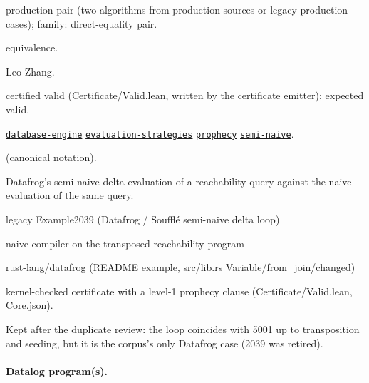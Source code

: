 \documentclass[10pt]{article}
\begin{document}
\begin{description}[leftmargin=2.6cm,style=nextline,itemsep=1pt]

\item[Category] production pair (two algorithms from production sources or legacy production cases); family: direct-equality pair.

\item[Kind] equivalence.

\item[Contributors] Leo Zhang.

\item[Status] certified valid (Certificate/Valid.lean, written by the certificate emitter); expected valid.

\item[Tags] \hyperref[tag:database-engine]{\texttt{database-engine}} \hyperref[tag:evaluation-strategies]{\texttt{evaluation-strategies}} \hyperref[tag:prophecy]{\texttt{prophecy}} \hyperref[tag:semi-naive]{\texttt{semi-naive}}.

\item[Input]  (canonical notation).

\item[Summary] Datafrog's semi-naive delta evaluation of a reachability query against the naive evaluation of the same query.

\item[Sides] legacy Example2039 (Datafrog / Soufflé semi-naive delta loop) \par naive compiler on the transposed reachability program

\item[Sources] {\raggedright \href{https://github.com/rust-lang/datafrog}{rust-lang/datafrog (README example, src/lib.rs Variable/from\_join/changed)}\par}

\item[Prophecy] kernel-checked certificate with a level-1 prophecy clause (Certificate/Valid.lean, Core.json).

\item[Note] Kept after the duplicate review: the loop coincides with 5001 up to transposition and seeding, but it is the corpus's only Datafrog case (2039 was retired).

\end{description}

\paragraph{Datalog program(s).}
\end{document}
